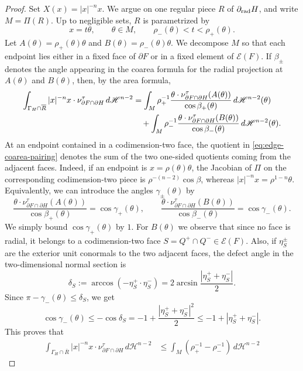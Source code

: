 \documentclass[reqno,11pt]{amsart}
\newcommand{\HH}{\mathscr H}
\numberwithin{equation}{section}
\theoremstyle{remark}
\begin{document}
\begin{proof}
Set $X(x)=|x|^{-n}x$. We argue on one regular piece $R$ of
$\partial_{\rm rad}H$, and write $M=\Pi(R)$. Up to negligible sets, $R$ is
parametrized by
\[
        x=t\theta,\qquad \theta\in M,\qquad
        \rho_-(\theta)<t<\rho_+(\theta).
\]
Let $A(\theta)=\rho_+(\theta)\theta$ and
$B(\theta)=\rho_-(\theta)\theta$. We decompose $M$ so that each endpoint lies
either in a fixed face of $\partial F$ or in a fixed element of
$\mathcal E(F)$. If $\beta_\pm$ denotes the angle appearing in the coarea
formula for the radial projection at $A(\theta)$ and $B(\theta)$, then, by the area formula,
\begin{align}\label{eq:edge-coarea-pairing}
\int_{\Gamma_H\cap\overline R}|x|^{-n}x\cdot
\nu^\tau_{\partial F\cap\partial H}\,d\HH^{n-2}
&=
\int_M \rho_+^{-1}
\frac{\theta\cdot\nu^\tau_{\partial F\cap\partial H}(A(\theta))}
{\cos\beta_+(\theta)}\,d\HH^{n-2}(\theta)\notag\\
&\quad+
\int_M \rho_-^{-1}
\frac{\theta\cdot\nu^\tau_{\partial F\cap\partial H}(B(\theta))}
{\cos\beta_-(\theta)}\,d\HH^{n-2}(\theta).
\end{align}
At an endpoint contained in a codimension-two face, the quotient in
\eqref{eq:edge-coarea-pairing} denotes the sum of the two one-sided quotients
coming from the adjacent faces.
Indeed, if an endpoint is $x=\rho(\theta)\theta$, the Jacobian of $\Pi$ on the
corresponding codimension-two piece is
$\rho^{-(n-2)}\cos\beta$, whereas
$|x|^{-n}x=\rho^{1-n}\theta$.
Equivalently, we can introduce the angles $\gamma_\pm(\theta)$ by
\[
\frac{\theta\cdot\nu^\tau_{\partial F\cap\partial H}(A(\theta))}
{\cos\beta_+(\theta)}
=\cos\gamma_+(\theta),\qquad
\frac{\theta\cdot\nu^\tau_{\partial F\cap\partial H}(B(\theta))}
{\cos\beta_-(\theta)}
=\cos\gamma_-(\theta).
\]
We simply bound $\cos\gamma_+(\theta)$ by $1$. For $B(\theta)$ we observe that since no face is radial, it belongs to a codimension-two face $S=Q^+\cap Q^-\in\mathcal E(F)$. Also, if $\eta_S^\pm$ are the
exterior unit conormals to the two adjacent faces, the defect angle in the
two-dimensional normal section is
\[
\delta_S:=\arccos(-\eta_S^+\cdot\eta_S^-)
=2\arcsin\frac{|\eta_S^++\eta_S^-|}{2}.
\]
Since $\pi-\gamma_-(\theta)\le\delta_S$, we get
\[
\cos\gamma_-(\theta)
\le -\cos\delta_S
=-1+\frac{|\eta_S^++\eta_S^-|^2}{2}
\le -1+|\eta_S^++\eta_S^-|.
\]
This proves that
\begin{align*}
\int_{\Gamma_H\cap\overline R}|x|^{-n}x\cdot
\nu^\tau_{\partial F\cap\partial H}\,d\HH^{n-2}
&\le
\int_M(\rho_+^{-1}-\rho_-^{-1})\,d\HH^{n-2}

\end{align*}
\end{proof}
\end{document}
